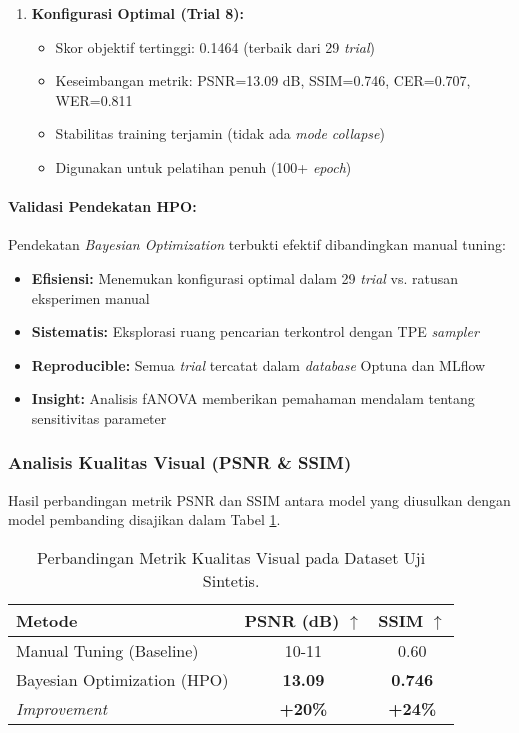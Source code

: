 \documentclass{article}
\begin{document}
\begin{enumerate}
    \item \textbf{Konfigurasi Optimal (Trial 8):}
    \begin{itemize}
        \item Skor objektif tertinggi: 0.1464 (terbaik dari 29 \textit{trial})
        \item Keseimbangan metrik: PSNR=13.09 dB, SSIM=0.746, CER=0.707, WER=0.811
        \item Stabilitas training terjamin (tidak ada \textit{mode collapse})
        \item Digunakan untuk pelatihan penuh (100+ \textit{epoch})
    \end{itemize}
\end{enumerate}

\paragraph{Validasi Pendekatan HPO:}

Pendekatan \textit{Bayesian Optimization} terbukti efektif dibandingkan manual tuning:
\begin{itemize}
    \item \textbf{Efisiensi:} Menemukan konfigurasi optimal dalam 29 \textit{trial} vs. ratusan eksperimen manual
    \item \textbf{Sistematis:} Eksplorasi ruang pencarian terkontrol dengan TPE \textit{sampler}
    \item \textbf{Reproducible:} Semua \textit{trial} tercatat dalam \textit{database} Optuna dan MLflow
    \item \textbf{Insight:} Analisis fANOVA memberikan pemahaman mendalam tentang sensitivitas parameter
\end{itemize}

\subsubsection{Analisis Kualitas Visual (PSNR \& SSIM)}
Hasil perbandingan metrik PSNR dan SSIM antara model yang diusulkan dengan model pembanding disajikan dalam Tabel \ref{tab:visual_results}.

\begin{table}[H]
\centering
\caption{Perbandingan Metrik Kualitas Visual pada Dataset Uji Sintetis.}
\label{tab:visual_results}
\begin{tabular}{lcc}
\toprule
\textbf{Metode} & \textbf{PSNR (dB) $\uparrow$} & \textbf{SSIM $\uparrow$} \\
\midrule
Manual Tuning (Baseline) & 10-11 & 0.60 \\
Bayesian Optimization (HPO) & \textbf{13.09} & \textbf{0.746} \\
\textit{Improvement} & \textbf{+20\%} & \textbf{+24\%} \\
\bottomrule
\end{tabular}
\end{table}
\end{document}
